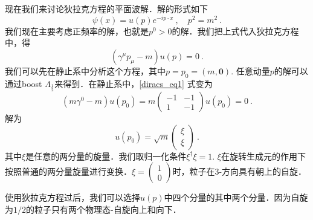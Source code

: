
现在我们来讨论狄拉克方程的平面波解．解的形式如下
\begin{equation}
\psi(x) = u(p)e^{-ip\cdot x}~, \quad p^2 = m^2~.
\end{equation}
我们现在主要考虑正频率的解，也就是$p^0>0$的解．我们把上式代入狄拉克方程中，得
\begin{equation}\label{diracs_eq1}
(\gamma^\mu p_\mu - m) u(p) = 0~.
\end{equation}
我们可以先在静止系中分析这个方程，其中$p=p_0=(m,\boldsymbol 0 )$. 任意动量$p$的解可以通过boost $\Lambda_{\frac{1}{2}}$来得到．在静止系中，\autoref{diracs_eq1} 式变为
\begin{equation}
(m\gamma^0-m)u(p_0) = m\begin{pmatrix}
-1 & -1 \\
 1 & -1
\end{pmatrix}u(p_0) = 0 ~.
\end{equation}
解为
\begin{equation}
u(p_0) = \sqrt{m} \begin{pmatrix}
\xi \\ \xi
\end{pmatrix}~.
\end{equation}
其中$\xi$是任意的两分量的旋量．我们取归一化条件$\xi^\dagger \xi =1$. $\xi$在旋转生成元的作用下按照普通的两分量旋量进行变换．$\xi = \begin{pmatrix}
1 \\0
\end{pmatrix}$时，粒子在3-方向具有朝上的自旋．

使用狄拉克方程过后，我们可以选择$u(p)$中四个分量的其中两个分量．因为自旋为$1/2$的粒子只有两个物理态-自旋向上和向下．

